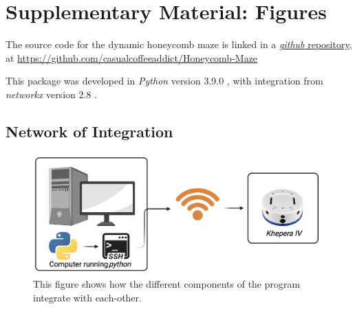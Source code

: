 

\newlength\myindent
\setlength\myindent{2em}
\newcommand\bindent{%
  \begingroup
  \setlength{\itemindent}{\myindent}
  \addtolength{\algorithmicindent}{\myindent}
}
\newcommand\eindent{\endgroup}



\appendix
\section{Supplementary Material: Figures}
The source code for the dynamic honeycomb maze is linked in a  \href{https://github.com/casualcoffeeaddict/Honeycomb-Maze}{\textit{github} repository},\\ at \href{https://github.com/casualcoffeeaddict/Honeycomb-Maze}{https://github.com/casualcoffeeaddict/Honeycomb-Maze}

This package was developed in \textit{Python} version 3.9.0 \cite{python3}, with integration from \textit{networkx} version 2.8 \cite{networkx}.

\subsection{Network of Integration}
\label{fig:integration_network}
\begin{figure}[H]
    \centering
    \includegraphics[scale = 0.6]{images/intergration_netwwork.png}
    \caption{This figure shows how the different components of the program integrate with each-other.}

\end{figure}

